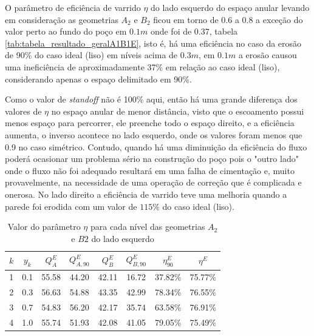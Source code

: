 O parâmetro de eficiência de varrido $\eta$ do lado esquerdo do espaço anular levando em consideração as geometrias $A_2$ e $B_2$ ficou em torno de 0.6 a 0.8 a exceção do valor perto ao fundo do poço em $0.1m$ onde foi de 0.37, tabela \ref{tab:tabela_resultado_geralA1B1E}, isto é, há uma eficiência no caso da erosão de 90\% do caso ideal (liso) em níveis acima de $0.3m$, em $0.1m$ a erosão causou uma ineficiência de aproximadamente 37\% em relação ao caso ideal (liso), considerando apenas o espaço delimitado em 90\%. 
    
Como o valor de \textit{standoff} não é 100\% aqui, então há uma grande diferença dos valores de $\eta$ no espaço anular de menor distância, visto que o escoamento possui menos espaço para percorrer, ele preenche todo o espaço direito, e a eficiência aumenta, o inverso acontece no lado esquerdo, onde os valores foram menos que 0.9 no caso simétrico. Contudo, quando há uma diminuição da eficiência do fluxo poderá ocasionar um problema sério na construção do poço pois o "outro lado" onde o fluxo não foi adequado resultará em uma falha de cimentação e, muito provavelmente, na necessidade de uma operação de correção que é complicada e onerosa. No lado direito a eficiência de varrido teve uma melhoria quando a parede foi erodida com um valor de $115\%$ do caso ideal (liso).
    
    \begin{table}[H]
        \centering
        \caption{Valor do parâmetro $\eta$ para cada nível das geometrias $A_2$ e $B2$ do lado esquerdo}
    	\begin{tabular}{cccccccc}
    		\hline
    		$k$ & $y_k$ & $Q_A^E$ & $Q_{A,90}^E$ & $Q_B^E$ & $Q_{B,90}^E$ & $\eta_{90}^E$ & $\eta^E$ \\
    		\hline
    		1 & 0.1 & 55.58 & 44.20 & 42.11 & 16.72 & 37.82\% & 75.77\% \\
    		2 & 0.3 & 56.63 & 54.88 & 43.35 & 42.99 & 78.34\% & 76.55\% \\
    		3 & 0.7 & 54.83 & 56.20 & 42.17 & 35.74 & 63.58\% & 76.91\% \\
    		4 & 1.0 & 55.74 & 51.93 & 42.08 & 41.05 & 79.05\% & 75.49\% \\
    		\hline
    	\end{tabular}
    	\label{tab:tabela_resultado_geralA2B2E}
    \end{table}
    
